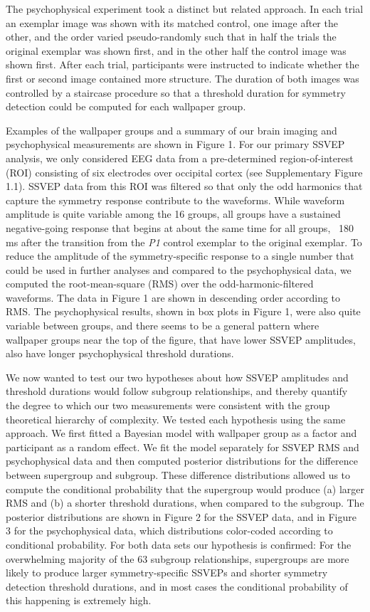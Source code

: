 \documentclass[11pt, twoside]{article}
\begin{document}
The psychophysical experiment took a distinct but related approach. In each trial an exemplar image was shown with its matched control, one image after the other, and the order varied pseudo-randomly such that in half the trials the original exemplar was shown first, and in the other half the control image was shown first. After each trial, participants were instructed to indicate whether the first or second image contained more structure. The duration of both images was controlled by a staircase procedure so that a threshold duration for symmetry detection could be computed for each wallpaper group. 

Examples of the wallpaper groups and a summary of our brain imaging and psychophysical measurements are shown in Figure 1. For our primary SSVEP analysis, we only considered EEG data from a pre-determined region-of-interest (ROI) consisting of six electrodes over occipital cortex (see Supplementary Figure 1.1). SSVEP data from this ROI was filtered so that only the odd harmonics that capture the symmetry response contribute to the waveforms. While waveform amplitude is quite variable among the 16 groups, all groups have a sustained negative-going response that begins at about the same time for all groups, ~180 ms after the transition from the \textit{P1} control exemplar to the original exemplar. To reduce the amplitude of the symmetry-specific response to a single number that could be used in further analyses and compared to the psychophysical data, we computed the root-mean-square (RMS) over the odd-harmonic-filtered waveforms. The data in Figure 1 are shown in descending order according to RMS. The psychophysical results, shown in box plots in Figure 1, were also quite variable between groups, and there seems to be a general pattern where wallpaper groups near the top of the figure, that have lower SSVEP amplitudes, also have longer psychophysical threshold durations. 

We now wanted to test our two hypotheses about how SSVEP amplitudes and threshold durations would follow subgroup relationships, and thereby quantify the degree to which our two measurements were consistent with the group theoretical hierarchy of complexity. We tested each hypothesis using the same approach. We first fitted a Bayesian model with wallpaper group as a factor and participant as a random effect. We fit the model separately for SSVEP RMS and psychophysical data and then computed posterior distributions for the difference between supergroup and subgroup. These difference distributions allowed us to compute the conditional probability that the supergroup would produce (a) larger RMS and (b) a shorter threshold durations, when compared to the subgroup. The posterior distributions are shown in Figure 2 for the SSVEP data, and in Figure 3 for the psychophysical data, which distributions color-coded according to conditional probability. For both data sets our hypothesis is confirmed: For the overwhelming majority of the 63 subgroup relationships, supergroups are more likely to produce larger symmetry-specific SSVEPs and shorter symmetry detection threshold durations, and in most cases the conditional probability of this happening is extremely high. 
\end{document}
